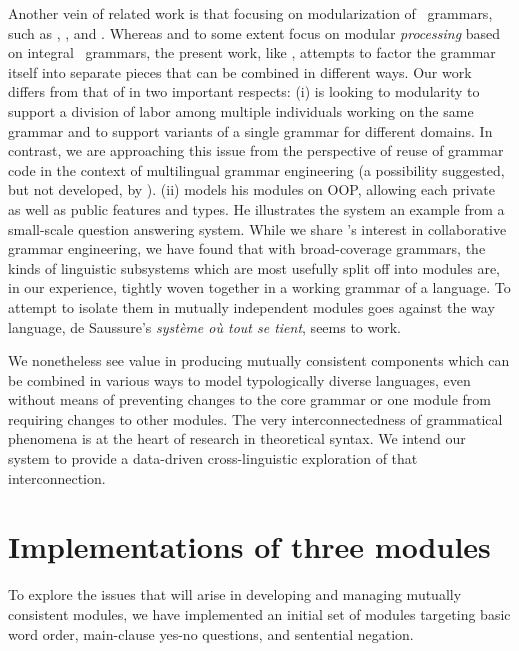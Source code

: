 Another vein of related work is that focusing on modularization of
\hpsg\ grammars, such as ,
, and . Whereas
\citeauthor{Kasper:Krieger:96} and to some extent
\citeauthor{Theofilidis:etal:97} focus on modular {\it processing}
based on integral \hpsg\ grammars, the present work, like
, attempts to factor the grammar itself into
separate pieces that can be combined in different ways.  Our work
differs from that of \citeauthor{Keselj:01} in two important respects:
(i) \citeauthor{Keselj:01} is looking to modularity to support a
division of labor among multiple individuals working on the same
grammar and to support variants of a single grammar for different
domains.  In contrast, we are approaching this issue from the
perspective of reuse of grammar code in the context of multilingual
grammar engineering (a possibility suggested, but not developed, by
). (ii) \citeauthor{Keselj:01} models
his modules on OOP, allowing each private as well as public features
and types.  He illustrates the system an example from a
small-scale question answering system.  While we share \citeauthor{Keselj:01}'s
interest in collaborative grammar engineering, we have found that 
with broad-coverage grammars, the kinds
of linguistic subsystems which are most usefully
split off into modules are, in our experience, tightly woven
together in a working grammar of a language.  To attempt to isolate
them in mutually independent modules goes against the way language,
de Saussure's {\it syst\`eme o\`u tout se tient}, seems to work.

We nonetheless see value in producing mutually consistent
components which can be combined in various ways to model
typologically diverse languages, even without means of 
preventing changes to the core grammar or one module from requiring
changes to other modules.  The very interconnectedness of grammatical
phenomena is at the heart of research in theoretical syntax.  We
intend our system to provide a data-driven cross-linguistic
exploration of that interconnection.

\section{Implementations of three modules}
\label{imp}

To explore the issues that will arise in developing and managing
mutually consistent modules, we have
implemented an initial set of modules targeting basic
word order, main-clause yes-no questions, and sentential negation.  

